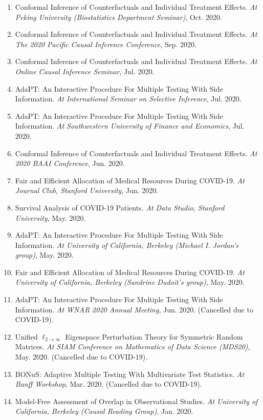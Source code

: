 \documentclass{article}
\begin{document}
\begin{enumerate}
\item Conformal Inference of Counterfactuals and Individual Treatment Effects. \emph{At Peking University (Biostatistics Department Seminar)}, Oct. 2020.
\item Conformal Inference of Counterfactuals and Individual Treatment Effects. \emph{At The 2020 Pacific Causal Inference Conference}, Sep. 2020.
\item Conformal Inference of Counterfactuals and Individual Treatment Effects. \emph{At Online Causal Inference Seminar}, Jul. 2020.
\item AdaPT: An Interactive Procedure For Multiple Testing With Side Information. \emph{At International Seminar on Selective Inference}, Jul. 2020. 
\item AdaPT: An Interactive Procedure For Multiple Testing With Side Information. \emph{At Southwestern University of Finance and Economics}, Jul. 2020. 
\item Conformal Inference of Counterfactuals and Individual Treatment Effects. \emph{At 2020 BAAI Conference}, Jun. 2020. 
\item Fair and Efficient Allocation of Medical Resources During COVID-19. \emph{At Journal Club, Stanford University}, Jun. 2020.
\item Survival Analysis of COVID-19 Patients. \emph{At Data Studio, Stanford University}, May. 2020.
\item AdaPT: An Interactive Procedure For Multiple Testing With Side Information. \emph{At University of California, Berkeley (Michael I. Jordan's group)}, May. 2020. 
\item Fair and Efficient Allocation of Medical Resources During COVID-19. \emph{At University of California, Berkeley (Sandrine Dudoit's group)}, May. 2020. 
\item AdaPT: An Interactive Procedure For Multiple Testing With Side Information. \emph{At WNAR 2020 Annual Meeting}, Jun. 2020. (Cancelled due to COVID-19).
\item Unified $\ell_{2\rightarrow\infty}$ Eigenspace Perturbation Theory for Symmetric Random Matrices. \emph{At SIAM Conference on Mathematics of Data Science (MDS20)}, May. 2020. (Cancelled due to COVID-19).
\item BONuS: Adaptive Multiple Testing With Multivariate Test Statistics. \emph{At Banff Workshop}, Mar. 2020. (Cancelled due to COVID-19).
\item Model-Free Assessment of Overlap in Observational Studies. \emph{At University of California, Berkeley (Causal Reading Group)}, Jan. 2020.

\end{enumerate}
\end{document}
